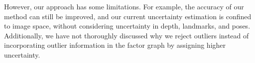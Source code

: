 However, our approach has some limitations. For example, the accuracy of our method can still be improved, and our current uncertainty estimation is confined to image space, without considering uncertainty in depth, landmarks, and poses. Additionally, we have not thoroughly discussed why we reject outliers instead of incorporating outlier information in the factor graph by assigning higher uncertainty. 